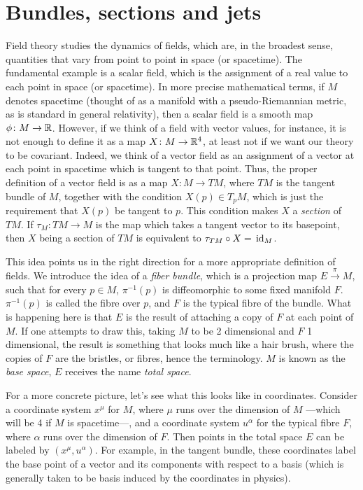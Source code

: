 \documentclass[../main.tex]{subfiles}
\begin{document}
\section{Bundles, sections and jets}
Field theory studies the dynamics of fields, which are, in the broadest sense, quantities
that vary from point to point in space (or spacetime). The fundamental example is a scalar
field, which is the assignment of a real value to each point in space (or spacetime). In
more precise mathematical terms, if \( M \) denotes spacetime (thought of as a manifold with a
pseudo-Riemannian metric, as is standard in general relativity), then a scalar field is a
smooth map \( \phi \colon M \to \mathbb{R} \). However, if we think of a field with vector values,
for instance, it is not enough to define it as a map \( X \colon M \to \mathbb{R}^4 \), at
least not if we want our theory to be covariant. Indeed, we think of a vector field as an
assignment of a vector at each point in spacetime which is tangent to that point. Thus,
the proper definition of a vector field is as a map \( X \colon M \to TM \), where \( TM
\) is the tangent bundle of \( M \), together with the condition \( X(p) \in T_pM \),
which is just the requirement that \( X(p) \) be tangent to \( p \). This condition makes
\( X \) a \emph{section} of \( TM \). If \( \tau_M \colon TM \to M \) is the map which
takes a tangent vector to its basepoint, then \( X \) being a section of \( TM \) is
equivalent to \( \tau_{TM} \circ X = \,\mathrm{id}_M \). 

This idea points us in the right direction for a more appropriate definition of fields. We
introduce the idea of a \emph{fiber bundle}, which is a projection map \( E
\xrightarrow{\pi} M \), such that for every \( p \in M \), \( \pi^{-1}(p) \) is
diffeomorphic to some fixed manifold \( F \). \( \pi^{-1}(p) \) is called the fibre over
\( p \), and \( F \) is the typical fibre of the bundle. What is happening here is that \(
E \) is the result of attaching a copy of \( F \) at each point of \( M \). If one
attempts to draw this, taking \( M  \) to be 2 dimensional and \( F \) 1 dimensional, the
result is something that looks much like a hair brush, where the copies of \( F \) are the
bristles, or fibres, hence the terminology. \( M \) is known as the \emph{base space}, \( E \)
receives the name \emph{total space}. 

For a more concrete picture, let's see what this looks like in coordinates. Consider a
coordinate system \( x^\mu \) for \( M \), where \( \mu \) runs over the dimension of
\( M \) ---which will be 4 if \( M \) is spacetime---, and a coordinate system \( u^\alpha
\) for the typical fibre \( F \), where \( \alpha \) runs over the dimension of \( F \).
Then points in the total space \( E \) can be labeled by \( (x^\mu, u^\alpha) \). For
example, in the tangent bundle, these coordinates label the base point of a vector and its
components with respect to a basis (which is generally taken to be basis induced by the
coordinates in physics). 
\end{document}
